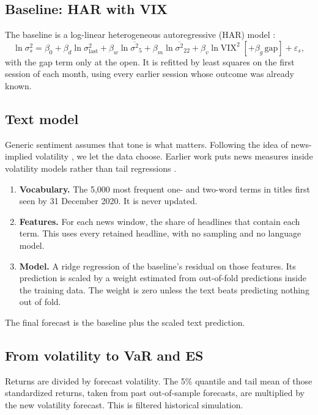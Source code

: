 \documentclass[11pt,a4paper]{article}
\begin{document}
\subsection{Baseline: HAR with VIX}
The baseline is a log-linear heterogeneous autoregressive (HAR) model \cite{corsi}:
\[
\ln \sigma^2_{s} = \beta_0+\beta_d \ln \sigma^2_{\text{last}}+\beta_w \ln \overline{\sigma^2}_{5}
+\beta_m \ln \overline{\sigma^2}_{22}+\beta_v \ln \mathrm{VIX}^2 \;[+\beta_g\,\text{gap}] + \varepsilon_s ,
\]
with the gap term only at the open. It is refitted by least squares on the first session of each
month, using every earlier session whose outcome was already known.

\subsection{Text model}
Generic sentiment assumes that tone is what matters. Following the idea of news-implied
volatility \cite{nvix}, we let the data choose. Earlier work puts news measures inside volatility models rather than tail regressions \cite{bcp}.
\begin{enumerate}
\item \textbf{Vocabulary.} The 5,000 most frequent one- and two-word terms in titles first seen
by 31 December 2020. It is never updated.
\item \textbf{Features.} For each news window, the share of headlines that contain each term.
This uses every retained headline, with no sampling and no language model.
\item \textbf{Model.} A ridge regression of the baseline's residual on those features. Its
prediction is scaled by a weight estimated from out-of-fold predictions inside the training
data. The weight is zero unless the text beats predicting nothing out of fold.
\end{enumerate}
The final forecast is the baseline plus the scaled text prediction.

\subsection{From volatility to VaR and ES}
Returns are divided by forecast volatility. The 5\% quantile and tail mean of those standardized
returns, taken from past out-of-sample forecasts, are multiplied by the new volatility forecast.
This is filtered historical simulation.
\end{document}
